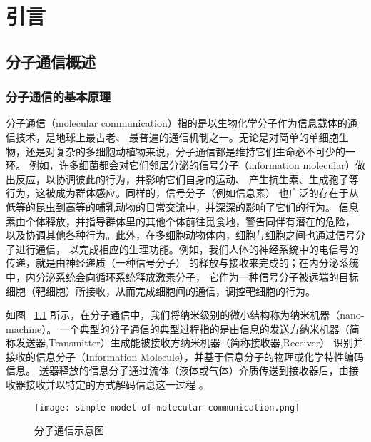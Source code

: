 


\chapter{引言}

\section{分子通信概述}
\subsection{分子通信的基本原理}
分子通信（molecular communication）指的是以生物化学分子作为信息载体的通信技术\cite{Hiyama2010Molecular}，是地球上最古老、
最普遍的通信机制之一。无论是对简单的单细胞生物，还是对复杂的多细胞动植物来说，分子通信都是维持它们生命必不可少的一环。
例如，许多细菌都会对它们邻居分泌的信号分子（information molecular）做出反应，以协调彼此的行为，并影响它们自身的运动、
产生抗生素、生成孢子等行为，这被成为群体感应。同样的，信号分子（例如信息素）
也广泛的存在于从低等的昆虫到高等的哺乳动物的日常交流中，并深深的影响了它们的行为。
信息素由个体释放，并指导群体里的其他个体前往觅食地，警告同伴有潜在的危险，
以及协调其他各种行为。此外，在多细胞动物体内，细胞与细胞之间也通过信号分子进行通信，
以完成相应的生理功能。例如，我们人体的神经系统中的电信号的传递，就是由神经递质（一种信号分子）
的释放与接收来完成的；在内分泌系统中，内分泌系统会向循环系统释放激素分子，
它作为一种信号分子被远端的目标细胞（靶细胞）所接收，从而完成细胞间的通信，调控靶细胞的行为\cite{Atakan2014Molecular}。

如图
~\ref{fig:molecular_communication_example}
所示，在分子通信中，我们将纳米级别的微小结构称为纳米机器（nano-machine）。
一个典型的分子通信的典型过程指的是由信息的发送方纳米机器（简称发送器,Transmitter）生成能被接收方纳米机器（简称接收器,Receiver）
识别并接收的信息分子（Information Molecule），并基于信息分子的物理或化学特性编码信息。
送器释放的信息分子通过流体（液体或气体）介质传送到接收器后，由接收器接收并以特定的方式解码信息这一过程\cite{基于扩散的分子通信与身体域纳米网络}
。
\begin{figure}[H]
    \centering
    \texttt{[image: simple model of molecular communication.png]}
    \caption{分子通信示意图\cite{compic}}
    \label{fig:molecular_communication_example}
\end{figure}

